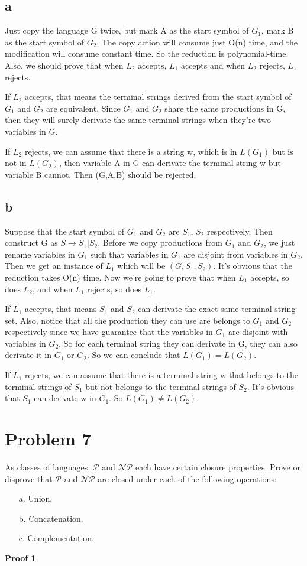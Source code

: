\documentclass[a4paper,UTF8]{ctexart}
\theoremstyle{definition}
\newtheorem*{prove}{Proof}
\begin{document}
\subsection*{a}
Just copy the language G twice, but mark A as the start symbol of $G_1$,
mark B as the start symbol of $G_2$. The copy action will consume just O(n) time,
and the modification will consume constant time. So the reduction is polynomial-time.
Also, we should prove that when $L_2$ accepts, $L_1$ accepts and when $L_2$ rejects, $L_1$ rejects.

If $L_2$ accepts, that means the terminal strings derived from the start symbol of $G_1$ and $G_2$
are equivalent. Since $G_1$ and $G_2$ share the same productions in G, then they will surely derivate
the same terminal strings when they're two variables in G.

If $L_2$ rejects, we can assume that there is a string w, which is in $L(G_1)$ but is not in $L(G_2)$,
then variable A in G can derivate the terminal string w but variable B cannot. Then (G,A,B) should be rejected.

\subsection*{b}
Suppose that the start symbol of $G_1$ and $G_2$ are $S_1$, $S_2$ respectively.
Then construct G as $S\rightarrow S_1|S_2$. Before we copy productions from $G_1$ and $G_2$, we 
just rename variables in $G_1$ such that variables in $G_1$ are disjoint from variables in $G_2$.
Then we get an instance of $L_1$ which will be $(G,S_1,S_2)$. It's obvious that the reduction takes
O(n) time. Now we're going to prove that when $L_1$ accepts, so does $L_2$,
 and when $L_1$ rejects, so does $L_1$.


If $L_1$ accepts, that means $S_1$ and $S_2$ can derivate the exact same terminal string set. 
Also, notice that all the production they can use are belongs to $G_1$ and $G_2$ respectively since
we have guarantee that the variables in $G_1$ are disjoint with variables in $G_2$. So for each terminal
string they can derivate in G, they can also derivate it in $G_1$ or $G_2$. So we can 
conclude that $L(G_1)=L(G_2)$.

If $L_1$ rejects, we can assume that there is a terminal string w that belongs to 
the terminal strings of $S_1$ but not belongs to the terminal strings of $S_2$. It's obvious that
$S_1$ can derivate w in $G_1$. So $L(G_1) \neq L(G_2)$.

\section*{Problem 7}
As classes of languages, $\mathcal{P}$ and $\mathcal{NP}$ each have certain closure properties. Prove or disprove that $\mathcal{P}$ and $\mathcal{NP}$ are closed under each of the following operations:
\begin{enumerate}
  \item[a.] Union.
  \item[b.] Concatenation.
  \item[c.] Complementation.
\end{enumerate}
\begin{prove}
\end{prove}
\end{document}
